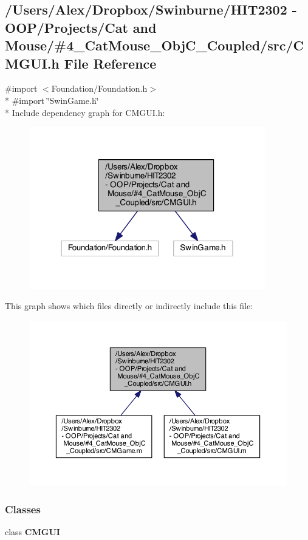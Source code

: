 \subsection{/\-Users/\-Alex/\-Dropbox/\-Swinburne/\-H\-I\-T2302 -\/ O\-O\-P/\-Projects/\-Cat and Mouse/\#4\-\_\-\-Cat\-Mouse\-\_\-\-Obj\-C\-\_\-\-Coupled/src/\-C\-M\-G\-U\-I.h File Reference}
\label{_c_m_g_u_i_8h}
{\ttfamily \#import $<$Foundation/\-Foundation.\-h$>$}\\*
{\ttfamily \#import \char`\"{}Swin\-Game.\-h\char`\"{}}\\*
Include dependency graph for C\-M\-G\-U\-I.\-h\-:
\nopagebreak
\begin{figure}[H]
\begin{center}
\leavevmode
\includegraphics[width=291pt]{_c_m_g_u_i_8h__incl}
\end{center}
\end{figure}
This graph shows which files directly or indirectly include this file\-:
\nopagebreak
\begin{figure}[H]
\begin{center}
\leavevmode
\includegraphics[width=350pt]{_c_m_g_u_i_8h__dep__incl}
\end{center}
\end{figure}
\subsubsection*{Classes}
\begin{DoxyCompactItemize}
\item 
class {\bf C\-M\-G\-U\-I}
\end{DoxyCompactItemize}
